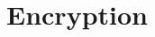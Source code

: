 \documentclass[12pt]{llncs}
\begin{document}

\section{Encryption}
\label{sec:encryption}
\end{document}
